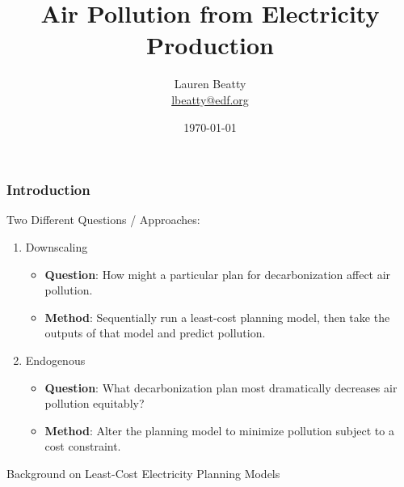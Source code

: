 \documentclass{beamer}
\title{Air Pollution from Electricity Production}
\author{Lauren Beatty\\ \href{mailto:lbeatty@edf.org}{lbeatty@edf.org}}
\institute{Environmental Defense Fund}
\date{\today}
\begin{document}
\frame{\titlepage}

\begin{frame}
\frametitle{Introduction}
Two Different Questions / Approaches:
\begin{enumerate}
    \item Downscaling
    \begin{itemize}
        \item \textbf{Question}: How might a particular plan for decarbonization affect air pollution.
        \item \textbf{Method}: Sequentially run a least-cost planning model, then take the outputs of that model and predict pollution.
    \end{itemize}
    \item Endogenous
    \begin{itemize}
        \item \textbf{Question}: What decarbonization plan most dramatically decreases air pollution equitably?
        \item \textbf{Method}: Alter the planning model to minimize pollution subject to a cost constraint.
    \end{itemize}
\end{enumerate}
\vspace{1cm}

\end{frame}


\begin{frame}{Background on Least-Cost Electricity Planning Models}
\begin{center}
\end{center}
\end{frame}
\end{document}
